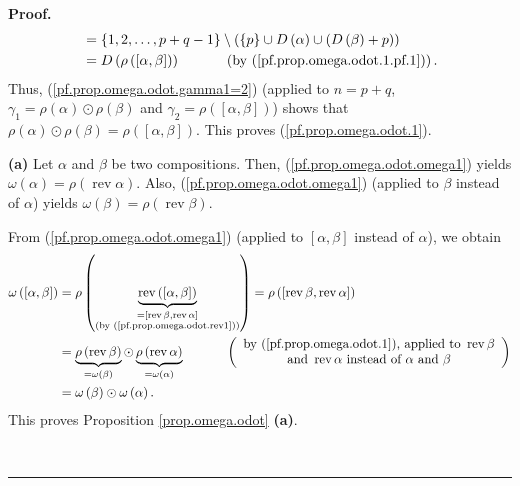 \documentclass[numbers=enddot,12pt,final,onecolumn,notitlepage,abstracton]{scrartcl}%
\theoremstyle{definition}
\newenvironment{proof}[1][Proof]{\noindent\textbf{#1.} }{\ \rule{0.5em}{0.5em}}
\newenvironment{verlong}{}{}
\begin{document}
\begin{verlong}
\begin{proof}
\begin{align*}
&  =\left\{  1,2,\ldots,p+q-1\right\}  \setminus\left(  \left\{  p\right\}
\cup D\left(  \alpha\right)  \cup\left(  D\left(  \beta\right)  +p\right)
\right) \\
&  =D\left(  \rho\left(  \left[  \alpha,\beta\right]  \right)  \right)
\ \ \ \ \ \ \ \ \ \ \left(  \text{by (\ref{pf.prop.omega.odot.1.pf.1}%
)}\right)  .
\end{align*}
Thus, (\ref{pf.prop.omega.odot.gamma1=2}) (applied to $n=p+q$, $\gamma
_{1}=\rho\left(  \alpha\right)  \odot\rho\left(  \beta\right)  $ and
$\gamma_{2}=\rho\left(  \left[  \alpha,\beta\right]  \right)  $) shows that
$\rho\left(  \alpha\right)  \odot\rho\left(  \beta\right)  =\rho\left(
\left[  \alpha,\beta\right]  \right)  $. This proves
(\ref{pf.prop.omega.odot.1}).

\textbf{(a)} Let $\alpha$ and $\beta$ be two compositions. Then,
(\ref{pf.prop.omega.odot.omega1}) yields $\omega\left(  \alpha\right)
=\rho\left(  \operatorname*{rev}\alpha\right)  $. Also,
(\ref{pf.prop.omega.odot.omega1}) (applied to $\beta$ instead of $\alpha$)
yields $\omega\left(  \beta\right)  =\rho\left(  \operatorname*{rev}%
\beta\right)  $.

From (\ref{pf.prop.omega.odot.omega1}) (applied to $\left[  \alpha
,\beta\right]  $ instead of $\alpha$), we obtain%
\begin{align*}
\omega\left(  \left[  \alpha,\beta\right]  \right)   &  =\rho\left(
\underbrace{\operatorname*{rev}\left(  \left[  \alpha,\beta\right]  \right)
}_{\substack{=\left[  \operatorname*{rev}\beta,\operatorname*{rev}%
\alpha\right]  \\\text{(by (\ref{pf.prop.omega.odot.rev1}))}}}\right)
=\rho\left(  \left[  \operatorname*{rev}\beta,\operatorname*{rev}%
\alpha\right]  \right) \\
&  =\underbrace{\rho\left(  \operatorname*{rev}\beta\right)  }_{=\omega\left(
\beta\right)  }\odot\underbrace{\rho\left(  \operatorname*{rev}\alpha\right)
}_{=\omega\left(  \alpha\right)  }\ \ \ \ \ \ \ \ \ \ \left(
\begin{array}
[c]{c}%
\text{by (\ref{pf.prop.omega.odot.1}), applied to }\operatorname*{rev}\beta\\
\text{and }\operatorname*{rev}\alpha\text{ instead of }\alpha\text{ and }\beta
\end{array}
\right) \\
&  =\omega\left(  \beta\right)  \odot\omega\left(  \alpha\right)  .
\end{align*}
This proves Proposition \ref{prop.omega.odot} \textbf{(a)}.


\end{proof}
\end{verlong}
\end{document}
